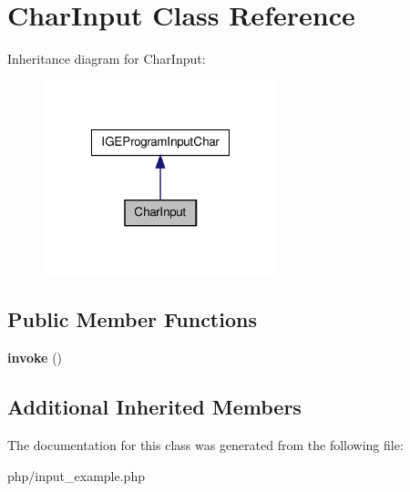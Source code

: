 \hypertarget{class_char_input}{\section{Char\-Input Class Reference}
\label{class_char_input}
}


Inheritance diagram for Char\-Input\-:
\nopagebreak
\begin{figure}[H]
\begin{center}
\leavevmode
\includegraphics[width=192pt]{class_char_input__inherit__graph}
\end{center}
\end{figure}
\subsection*{Public Member Functions}
\begin{DoxyCompactItemize}
\item 
\hypertarget{class_char_input_a3ec01ee4e5f0c5babf422263cb86d019}{{\bfseries invoke} ()}\label{class_char_input_a3ec01ee4e5f0c5babf422263cb86d019}

\end{DoxyCompactItemize}
\subsection*{Additional Inherited Members}


The documentation for this class was generated from the following file\-:\begin{DoxyCompactItemize}
\item 
php/input\-\_\-example.\-php\end{DoxyCompactItemize}
